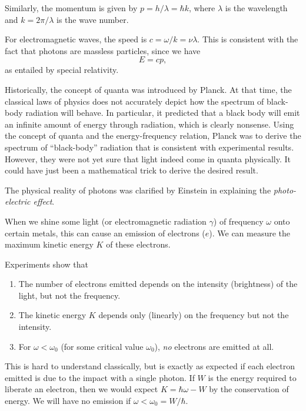 \documentclass[a4paper]{article}
\begin{document}
Similarly, the momentum is given by $p = h/\lambda = \hbar k$, where $\lambda$ is the wavelength and $k = 2\pi/\lambda$ is the wave number.

For electromagnetic waves, the speed is $c = \omega/k = \nu\lambda$. This is consistent with the fact that photons are massless particles, since we have
\[
  E = cp,
\]
as entailed by special relativity.

Historically, the concept of quanta was introduced by Planck. At that time, the classical laws of physics does not accurately depict how the spectrum of black-body radiation will behave. In particular, it predicted that a black body will emit an infinite amount of energy through radiation, which is clearly nonsense. Using the concept of quanta and the energy-frequency relation, Planck was to derive the spectrum of ``black-body'' radiation that is consistent with experimental results. However, they were not yet sure that light indeed come in quanta physically. It could have just been a mathematical trick to derive the desired result.

The physical reality of photons was clarified by Einstein in explaining the \emph{photo-electric effect}.

When we shine some light (or electromagnetic radiation $\gamma$) of frequency $\omega$ onto certain metals, this can cause an emission of electrons ($e$). We can measure the maximum kinetic energy $K$ of these electrons.
\begin{center}
\end{center}
Experiments show that
\begin{enumerate}
  \item The number of electrons emitted depends on the intensity (brightness) of the light, but not the frequency.
  \item The kinetic energy $K$ depends only (linearly) on the frequency but not the intensity.
  \item For $\omega < \omega_0$ (for some critical value $\omega_0$), \emph{no} electrons are emitted at all.
\end{enumerate}
This is hard to understand classically, but is exactly as expected if each electron emitted is due to the impact with a single photon. If $W$ is the energy required to liberate an electron, then we would expect $K = \hbar \omega - W$ by the conservation of energy. We will have no emission if $\omega < \omega_0 = W/\hbar$.
\end{document}

